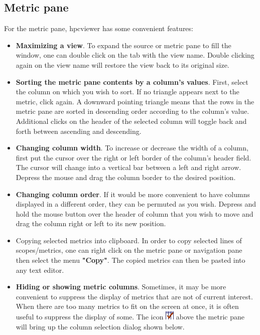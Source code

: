 \documentclass[a4paper,11pt]{article}
\begin{document}
\subsection{Metric pane}

 For the metric pane, hpcviewer has some convenient features: 
\begin{itemize}
	\item \textbf{Maximizing a view}. To expand the source or metric pane to   fill the window, one can double click on the tab with the view   name. Double clicking again on the view name will restore the view   back to its original size.   
\\
	\item \textbf{Sorting the metric pane contents by a column's  values}. First, select the column on which you wish to  sort. If no triangle appears next to the metric, click again.  A downward pointing triangle means that the rows in the metric  pane are sorted in descending order according to the column's  value. Additional clicks on the header of the selected column  will toggle back and forth between ascending and descending. 
	\item \textbf{Changing column width}. To increase or decrease the width of a column, first put the cursor over the right or left border of the column's header field. The cursor will change into a vertical bar between a left and right arrow. Depress the mouse and drag the column border to the desired position. 
	\item \textbf{Changing column order}. If it would be more convenient to have columns displayed in a different order, they can be permuted as you wish. Depress and hold the mouse button over the header of column that you wish to move and drag the column right or left to its new position. 
	\item Copying selected metrics into clipboard. In order to copy selected  lines of scopes/metrics, one can right click on the metric pane or navigation pane  then select the menu \textbf{"Copy"}. The copied metrics can then be pasted into  any text editor.  
	\item \textbf{Hiding or showing metric columns}. Sometimes, it may be more convenient to suppress the display of metrics that are not of current interest. When there are too many metrics to fit on the screen at once, it is often useful to suppress the display of some. The icon 
\includegraphics{images/checkColumns.gif}  above the metric pane will bring up the column selection dialog shown below.
\end{itemize}
\end{document}
